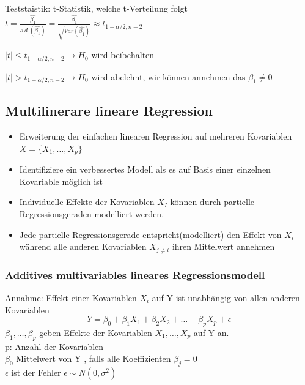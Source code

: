 \documentclass[10pt]{report}
\theoremstyle{definition}
\begin{document}
Teststaistik: t-Statistik, welche t-Verteilung folgt $t= \frac{\hat{\beta_1}}{s.d.(\hat{\beta_1})} = \frac{\hat{\beta_1}}{\sqrt{Var(\hat{\beta_1})}} \approx t_{1-\alpha/2, n-2}$

$|t| \leq  t_{1-\alpha/2, n-2} \rightarrow H_0$ wird beibehalten

$|t| >  t_{1-\alpha/2, n-2} \rightarrow H_0$ wird abelehnt, wir können annehmen das $\beta_1 \neq 0$


\subsection{Multilinerare lineare Regression}
\begin{itemize}
	\item Erweiterung der einfachen linearen Regression auf mehreren Kovariablen $X=\{{X_1, \ldots, X_p}\}$
	\item Identifiziere ein verbessertes Modell als es auf Basis einer einzelnen Kovariable möglich ist 
	\item Individuelle Effekte der Kovariablen $X_I$ können durch partielle Regressionsgeraden modelliert werden.
	\item  Jede partielle Regressionsgerade entspricht(modelliert) den Effekt von $X_i$ während alle anderen Kovariablen $X_{j \neq i}$ ihren Mittelwert annehmen
\end{itemize}

\subsubsection{Additives multivariables lineares Regressionsmodell}
Annahme: Effekt einer Kovariablen $X_i$ auf Y ist unabhängig von allen anderen Kovariablen 
\[Y = \beta_0 + \beta_1X_1 + \beta_2X_2 + \ldots + \beta_p X_p + \epsilon\]
$ \beta_1,\ldots,\beta_p$ geben Effekte der Kovariablen $X_1, \ldots, X_p$ auf Y an.\\
p: Anzahl der Kovariablen\\ 
$ \beta_0 $ Mittelwert von Y , falls alle Koeffizienten $ \beta_j = 0 $\\
$\epsilon$ ist der Fehler $\epsilon \sim N(0, \sigma^2)$
\end{document}
